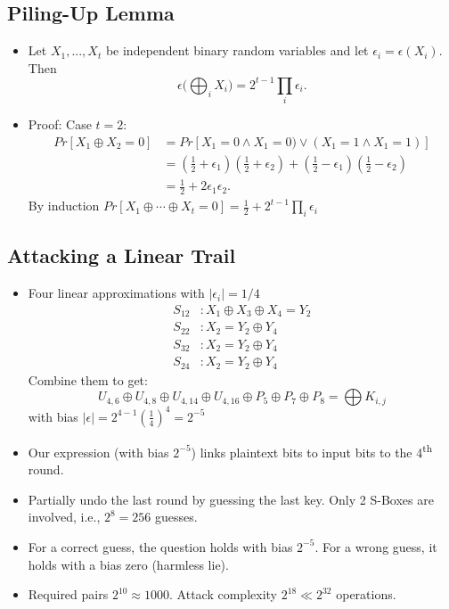 \documentclass[a4paper]{scrartcl}
\newcommand{\ts}{\textsuperscript}
\begin{document}
\subsection*{Piling-Up Lemma}

\begin{itemize}
\item Let $X_1, ..., X_t$ be independent binary random variables and let $\epsilon_i = \epsilon(X_i)$. Then $$\epsilon \Bigg(\bigoplus_{i}X_i\Bigg) = 2^{t-1} \prod_{i} \epsilon_i .$$ 
\item Proof: Case $t = 2$:
\begin{align*}
Pr[X_1 \oplus X_2 = 0] &= Pr[X_1 = 0 \land X_1 = 0) \lor (X_1 = 1 \land X_1 = 1)]\\
&= (\frac{1}{2} + \epsilon_1)(\frac{1}{2} + \epsilon_2)+(\frac{1}{2} - \epsilon_1)(\frac{1}{2} - \epsilon_2)\\
&=\frac{1}{2} + 2\epsilon_1 \epsilon_2.
\end{align*}
By induction $Pr[X_1 \oplus \cdots \oplus X_t = 0] = \frac{1}{2} + 2^{t-1}\prod_{i} \epsilon_i$
\end{itemize}
\subsection*{Attacking a Linear Trail}
\begin{itemize}
\item Four linear approximations with $|\epsilon_i| = 1/4$
\begin{align*}
S_{12} &: X_1 \oplus X_3 \oplus X_4 = Y_2\\
S_{22} &: X_2 = Y_2 \oplus Y_4\\
S_{32} &: X_2 = Y_2 \oplus Y_4\\
S_{24} &: X_2 = Y_2 \oplus Y_4
\end{align*}
Combine them to get:
$$U_{4,6} \oplus U_{4,8} \oplus U_{4,14} \oplus U_{4,16} \oplus P_5 \oplus P_7 \oplus P_8 = \bigoplus K_{i,j}$$
with bias $|\epsilon| = 2^{4-1}(\frac{1}{4})^4 = 2^{-5}$
\item Our expression (with bias $2^{-5}$) links plaintext bits to input bits to the 4\ts{th} round.
\item Partially undo the last round by guessing the last key. Only 2 S-Boxes are involved, i.e., $2^8 = 256$ guesses.
\item For a correct guess, the question holds with bias $2^{-5}$. For a wrong guess, it holds with a bias zero (harmless lie).
\item Required pairs $2^{10} \approx 1000$. Attack complexity $2^{18} \ll 2^{32}$ operations.
\end{itemize}
\end{document}
